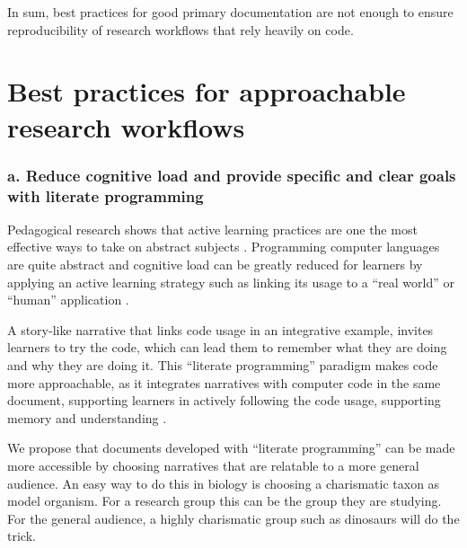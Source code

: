 \documentclass[12pt]{article}
\begin{document}






In sum, best practices for good primary documentation are not enough to ensure
reproducibility of research workflows that rely heavily on code.

\section*{Best practices for approachable research workflows}
\label{sec:addressing}

\subsubsection*{a. Reduce cognitive load and provide specific and clear goals
with literate programming}

Pedagogical research shows that active learning practices are one the most effective
ways to take on abstract subjects \citep{freeman2014active}.
Programming computer languages are quite abstract and cognitive load can be greatly
reduced for learners by applying an active learning strategy such as linking its usage to
a ``real world'' or ``human'' application \citep{felder2009active}.

A story-like narrative that links code usage in an integrative example, invites learners
to try the code, which can lead them to remember what they are doing and
why they are doing it.
This ``literate programming'' paradigm \citep{knuth1984literate, fritzson2002mathmodelica}
makes code more approachable, as it integrates narratives with computer code in
the same document, supporting learners in actively following
the code usage, supporting memory and understanding \citep{piccolo2016tools}.

We propose that documents developed with ``literate programming'' can be made more
accessible by choosing narratives that are relatable to a more general audience.
An easy way to do this in biology is choosing a charismatic taxon as model organism.
For a research group this can be the group they are studying. For the general audience,
a highly charismatic group such as dinosaurs will do the trick.
\end{document}
